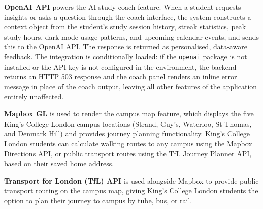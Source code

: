 \textbf{OpenAI API} powers the AI study coach feature. When a student requests insights or asks a question through the coach interface, the system constructs a context object from the student's study session history, streak statistics, peak study hours, dark mode usage patterns, and upcoming calendar events, and sends this to the OpenAI API. The response is returned as personalised, data-aware feedback. The integration is conditionally loaded: if the \texttt{openai} package is not installed or the API key is not configured in the environment, the backend returns an HTTP 503 response and the coach panel renders an inline error message in place of the coach output, leaving all other features of the application entirely unaffected.

\textbf{Mapbox GL} is used to render the campus map feature, which displays the five King's College London campus locations (Strand, Guy's, Waterloo, St Thomas, and Denmark Hill) and provides journey planning functionality. King's College London students can calculate walking routes to any campus using the Mapbox Directions API, or public transport routes using the TfL Journey Planner API, based on their saved home address.

\textbf{Transport for London (TfL) API} is used alongside Mapbox to provide public transport routing on the campus map, giving King's College London students the option to plan their journey to campus by tube, bus, or rail.
